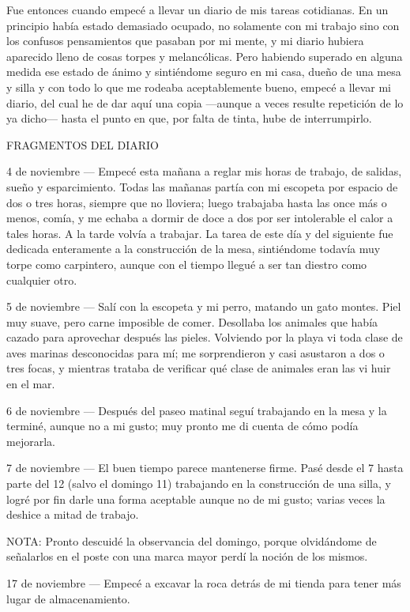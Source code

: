 \documentclass{novela}
\begin{document}
    Fue entonces cuando empecé a llevar un diario de mis tareas cotidianas. En un principio había estado demasiado ocupado, no solamente con mi trabajo sino con los confusos pensamientos que pasaban por mi mente, y mi diario hubiera aparecido lleno de cosas torpes y melancólicas. Pero habiendo superado en alguna medida ese estado de ánimo y sintiéndome seguro en mi casa, dueño de una mesa y silla y con todo lo que me rodeaba aceptablemente bueno, empecé a llevar mi diario, del cual he de dar aquí una copia —aunque a veces resulte repetición de lo ya dicho— hasta el punto en que, por falta de tinta, hube de interrumpirlo.


    FRAGMENTOS DEL DIARIO


    4 de noviembre — Empecé esta mañana a reglar mis horas de trabajo, de salidas, sueño y esparcimiento. Todas las mañanas partía con mi escopeta por espacio de dos o tres horas, siempre que no lloviera; luego trabajaba hasta las once más o menos, comía, y me echaba a dormir de doce a dos por ser intolerable el calor a tales horas. A la tarde volvía a trabajar. La tarea de este día y del siguiente fue dedicada enteramente a la construcción de la mesa, sintiéndome todavía muy torpe como carpintero, aunque con el tiempo llegué a ser tan diestro como cualquier otro.


    5  de noviembre — Salí con la escopeta y mi perro, matando un gato montes. Piel muy suave, pero carne imposible de comer. Desollaba los animales que había cazado para aprovechar después las pieles. Volviendo por la playa vi toda clase de aves marinas desconocidas para mí; me sorprendieron y casi asustaron a dos o tres focas, y mientras trataba de verificar qué clase de animales eran las vi huir en el mar.


    6  de noviembre — Después del paseo matinal seguí trabajando en la mesa y la terminé, aunque no a mi gusto; muy pronto me di cuenta de cómo podía mejorarla.


    7  de noviembre — El buen tiempo parece mantenerse firme. Pasé desde el 7 hasta parte del 12 (salvo el domingo 11) trabajando en la construcción de una silla, y logré por fin darle una forma aceptable aunque no de mi gusto; varias veces la deshice a mitad de trabajo.


    NOTA: Pronto descuidé la observancia del domingo, porque olvidándome de señalarlos en el poste con una marca mayor perdí la noción de los mismos.


    17 de noviembre — Empecé a excavar la roca detrás de mi tienda para tener más lugar de almacenamiento.
\end{document}
